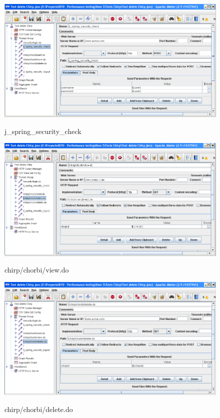 \documentclass[a4paper]{article}
\begin{document}
\begin{figure}
\caption{j\_spring\_security\_check}
\includegraphics[width=\linewidth]{Config2}
\label{fig:Config2}
\end{figure}

\begin{figure}
\caption{chirp/chorbi/view.do}
\includegraphics[width=\linewidth]{Config3}
\label{fig:Config3}
\end{figure}

\begin{figure}
\caption{chirp/chorbi/delete.do}
\includegraphics[width=\linewidth]{Config4}
\label{fig:Config4}
\end{figure}
\end{document}
